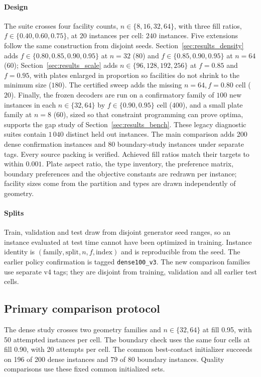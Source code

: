 \documentclass[preprint,12pt,authoryear]{elsarticle}
\begin{document}
\paragraph{Design}
The suite crosses four facility counts, $n\in\{8,16,32,64\}$, with three fill
ratios, $f\in\{0.40,0.60,0.75\}$, at $20$ instances per cell: $240$ instances.
Five extensions follow the same construction from disjoint seeds.
Section~\ref{sec:results_density} adds $f\in\{0.80,0.85,0.90,0.95\}$ at $n=32$
($80$) and $f\in\{0.85,0.90,0.95\}$ at $n=64$ ($60$);
Section~\ref{sec:results_scale} adds $n\in\{96,128,192,256\}$ at $f=0.85$ and
$f=0.95$, with plates enlarged in proportion so facilities do not shrink to the
minimum size ($180$). The certified sweep adds the missing $n=64,f=0.80$ cell
($20$). Finally, the frozen decoders are run on a confirmatory family of $100$
new instances in each $n\in\{32,64\}$ by $f\in\{0.90,0.95\}$ cell ($400$), and
a small plate family at $n=8$ ($60$), sized so that constraint programming can
prove optima, supports the gap study of Section~\ref{sec:results_bench}.
These legacy diagnostic suites contain $1\,040$ distinct held out instances.
The main comparison adds 200 dense confirmation instances and 80
boundary-study instances under separate tags. Every source packing is verified.
Achieved fill ratios match their targets to within $0.001$. Plate aspect ratio, the type
inventory, the preference matrix, boundary preferences and the objective
constants are redrawn per instance; facility sizes come from the partition and
types are drawn independently of geometry.

\paragraph{Splits}
Train, validation and test draw from disjoint generator seed ranges, so an
instance evaluated at test time cannot have been optimized in training. Instance
identity is $(\text{family},\text{split},n,f,\text{index})$ and is reproducible
from the seed. The earlier policy confirmation is tagged
\texttt{dense100\_v3}. The new comparison families use separate v4 tags;
they are disjoint from training, validation and all earlier test cells.

\subsection{Primary comparison protocol}
The dense study crosses two geometry families and $n\in\{32,64\}$ at fill
0.95, with 50 attempted instances per cell. The boundary check uses the same
four cells at fill 0.90, with 20 attempts per cell. The common best-contact
initializer succeeds on 196 of 200 dense instances and 79 of 80 boundary
instances. Quality comparisons use these fixed common initialized sets.
\end{document}
